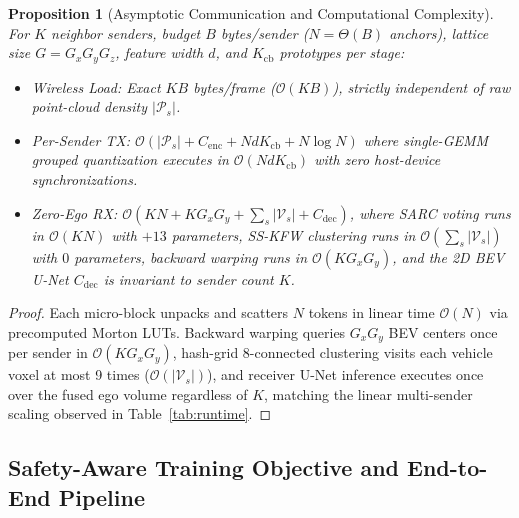 \documentclass[journal]{IEEEtran}
\newtheorem{proposition}{Proposition}
\begin{document}
\begin{proposition}[Asymptotic Communication and Computational Complexity]
For $K$ neighbor senders, budget $B$ bytes/sender ($N = \Theta(B)$ anchors), lattice size $G = G_x G_y G_z$, feature width $d$, and $K_{\mathrm{cb}}$ prototypes per stage:
\begin{itemize}
\item \textit{Wireless Load:} Exact $K B$ bytes/frame ($\mathcal{O}(K B)$), strictly independent of raw point-cloud density $|\mathcal{P}_s|$.
\item \textit{Per-Sender TX:} $\mathcal{O}(|\mathcal{P}_s| + C_{\mathrm{enc}} + N d K_{\mathrm{cb}} + N \log N)$ where single-GEMM grouped quantization executes in $\mathcal{O}(N d K_{\mathrm{cb}})$ with zero host-device synchronizations.
\item \textit{Zero-Ego RX:} $\mathcal{O}\!\left(K N + K G_x G_y + \sum_s |\mathcal{V}_s| + C_{\mathrm{dec}}\right)$, where SARC voting runs in $\mathcal{O}(K N)$ with $+13$ parameters, SS-KFW clustering runs in $\mathcal{O}(\sum_s |\mathcal{V}_s|)$ with $0$ parameters, backward warping runs in $\mathcal{O}(K G_x G_y)$, and the 2D BEV U-Net $C_{\mathrm{dec}}$ is invariant to sender count $K$.
\end{itemize}
\end{proposition}
\begin{proof}
Each micro-block unpacks and scatters $N$ tokens in linear time $\mathcal{O}(N)$ via precomputed Morton LUTs. Backward warping queries $G_x G_y$ BEV centers once per sender in $\mathcal{O}(K G_x G_y)$, hash-grid 8-connected clustering visits each vehicle voxel at most 9 times ($\mathcal{O}(|\mathcal{V}_s|)$), and receiver U-Net inference executes once over the fused ego volume regardless of $K$, matching the linear multi-sender scaling observed in Table~\ref{tab:runtime}.
\end{proof}

\subsection{Safety-Aware Training Objective and End-to-End Pipeline}
\end{document}
